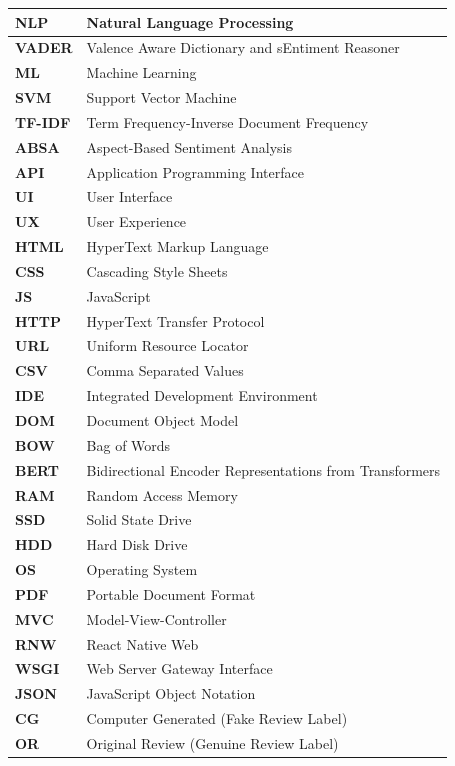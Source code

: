 \documentclass[12pt,a4paper]{report}
\begin{document}
\vspace{0.5cm}
\begin{longtable}{|p{3cm}|p{10cm}|}
\hline
\textbf{NLP}    & Natural Language Processing \\ \hline
\textbf{VADER}  & Valence Aware Dictionary and sEntiment Reasoner \\ \hline
\textbf{ML}     & Machine Learning \\ \hline
\textbf{SVM}    & Support Vector Machine \\ \hline
\textbf{TF-IDF} & Term Frequency-Inverse Document Frequency \\ \hline
\textbf{ABSA}   & Aspect-Based Sentiment Analysis \\ \hline
\textbf{API}    & Application Programming Interface \\ \hline
\textbf{UI}     & User Interface \\ \hline
\textbf{UX}     & User Experience \\ \hline
\textbf{HTML}   & HyperText Markup Language \\ \hline
\textbf{CSS}    & Cascading Style Sheets \\ \hline
\textbf{JS}     & JavaScript \\ \hline
\textbf{HTTP}   & HyperText Transfer Protocol \\ \hline
\textbf{URL}    & Uniform Resource Locator \\ \hline
\textbf{CSV}    & Comma Separated Values \\ \hline
\textbf{IDE}    & Integrated Development Environment \\ \hline
\textbf{DOM}    & Document Object Model \\ \hline
\textbf{BOW}    & Bag of Words \\ \hline
\textbf{BERT}   & Bidirectional Encoder Representations from Transformers \\ \hline
\textbf{RAM}    & Random Access Memory \\ \hline
\textbf{SSD}    & Solid State Drive \\ \hline
\textbf{HDD}    & Hard Disk Drive \\ \hline
\textbf{OS}     & Operating System \\ \hline
\textbf{PDF}    & Portable Document Format \\ \hline
\textbf{MVC}    & Model-View-Controller \\ \hline
\textbf{RNW}    & React Native Web \\ \hline
\textbf{WSGI}   & Web Server Gateway Interface \\ \hline
\textbf{JSON}   & JavaScript Object Notation \\ \hline
\textbf{CG}     & Computer Generated (Fake Review Label) \\ \hline
\textbf{OR}     & Original Review (Genuine Review Label) \\ \hline
\end{longtable}
\end{document}
